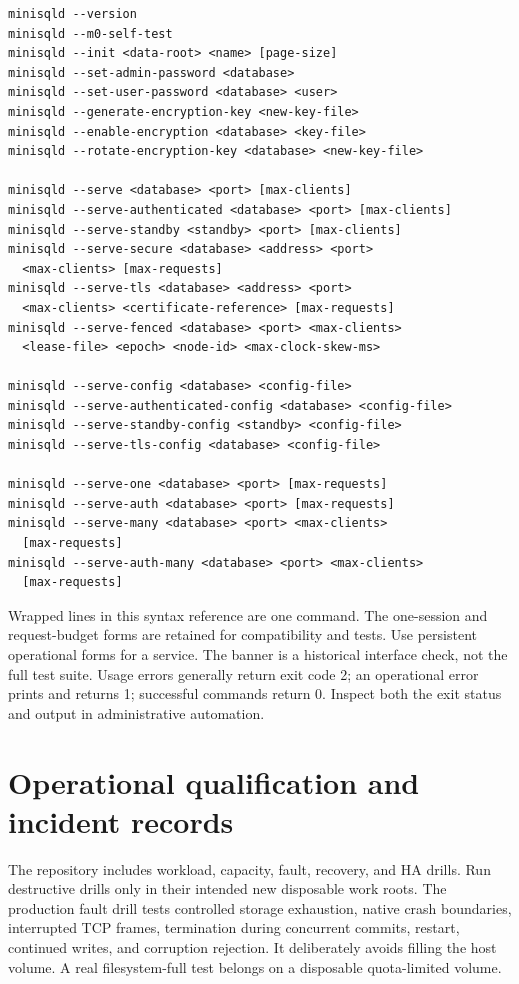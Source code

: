 \begin{lstlisting}
minisqld --version
minisqld --m0-self-test
minisqld --init <data-root> <name> [page-size]
minisqld --set-admin-password <database>
minisqld --set-user-password <database> <user>
minisqld --generate-encryption-key <new-key-file>
minisqld --enable-encryption <database> <key-file>
minisqld --rotate-encryption-key <database> <new-key-file>

minisqld --serve <database> <port> [max-clients]
minisqld --serve-authenticated <database> <port> [max-clients]
minisqld --serve-standby <standby> <port> [max-clients]
minisqld --serve-secure <database> <address> <port>
  <max-clients> [max-requests]
minisqld --serve-tls <database> <address> <port>
  <max-clients> <certificate-reference> [max-requests]
minisqld --serve-fenced <database> <port> <max-clients>
  <lease-file> <epoch> <node-id> <max-clock-skew-ms>

minisqld --serve-config <database> <config-file>
minisqld --serve-authenticated-config <database> <config-file>
minisqld --serve-standby-config <standby> <config-file>
minisqld --serve-tls-config <database> <config-file>

minisqld --serve-one <database> <port> [max-requests]
minisqld --serve-auth <database> <port> [max-requests]
minisqld --serve-many <database> <port> <max-clients>
  [max-requests]
minisqld --serve-auth-many <database> <port> <max-clients>
  [max-requests]
\end{lstlisting}

Wrapped lines in this syntax reference are one command. The one-session and
request-budget forms are retained for compatibility and tests. Use persistent
operational forms for a service. The  banner is a
historical interface check, not the full test suite. Usage errors generally
return exit code 2; an operational error prints 
and returns 1; successful commands return 0. Inspect both the exit status and
output in administrative automation.


\section{Operational qualification and incident records}

The repository includes workload, capacity, fault, recovery, and HA drills.
Run destructive drills only in their intended new disposable work roots.
The production fault drill tests controlled storage exhaustion, native crash
boundaries, interrupted TCP frames, termination during concurrent commits,
restart, continued writes, and corruption rejection. It deliberately avoids
filling the host volume. A real filesystem-full test belongs on a disposable
quota-limited volume.

